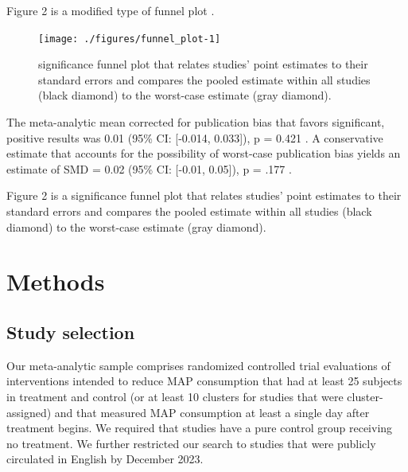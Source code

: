 \documentclass[sn-nature,referee,pdflatex]{sn-jnl}
\begin{document}
Figure 2 is a modified type of funnel plot \citep{mathur2020}.

\begin{figure}[H]

{\centering \texttt{[image: ./figures/funnel\_plot-1]} 

}

\caption{significance funnel plot that relates studies' point estimates to their standard errors and compares the pooled estimate within all studies (black diamond) to the worst-case estimate (gray diamond).}\label{fig:funnel_plot}
\end{figure}

The meta-analytic mean corrected for publication bias that favors
significant, positive results was 0.01 (95\% CI: {[}-0.014, 0.033{]}), p
= 0.421 \citep{hedges1992}. A conservative estimate that accounts for
the possibility of worst-case publication bias yields an estimate of SMD
= 0.02 (95\% CI: {[}-0.01, 0.05{]}), p = .177
\citep{mathur2020, mathur2024}.

Figure 2 is a significance funnel plot \citep{mathur2020} that relates
studies' point estimates to their standard errors and compares the
pooled estimate within all studies (black diamond) to the worst-case
estimate (gray diamond).

\section{Methods}\label{sec3}

\subsection{Study selection}\label{sec3.1}

Our meta-analytic sample comprises randomized controlled trial
evaluations of interventions intended to reduce MAP consumption that had
at least 25 subjects in treatment and control (or at least 10 clusters
for studies that were cluster-assigned) and that measured MAP
consumption at least a single day after treatment begins. We required
that studies have a pure control group receiving no treatment. We
further restricted our search to studies that were publicly circulated
in English by December 2023.
\end{document}
